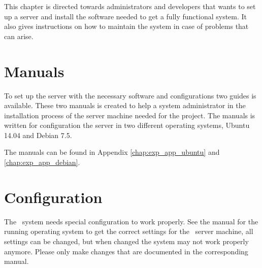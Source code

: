 This chapter is directed towards administrators and developers that wants to
set up a server and install the software needed to get a fully functional system.
It also gives instructions on how to maintain the system in case of problems
that can arise.
\section{Manuals}
To set up the server with the necessary software and configurations two guides is available. These two manuals is created to help a system administrator in the installation process of the server machine needed for the project. The manuals is written for configuration the server in two different operating systems, Ubuntu 14.04 and Debian 7.5. 

The manuals can be found in Appendix \ref{chap:exp_app_ubuntu} and \ref{chap:exp_app_debian}.

\section{Configuration}
The \appName\ system needs special configuration to work properly. See the manual for the running operating system to get the correct settings for the \appName\ server machine, all settings can be changed, but when changed the system may not work properly anymore. Please only make changes that are documented in the corresponding manual.